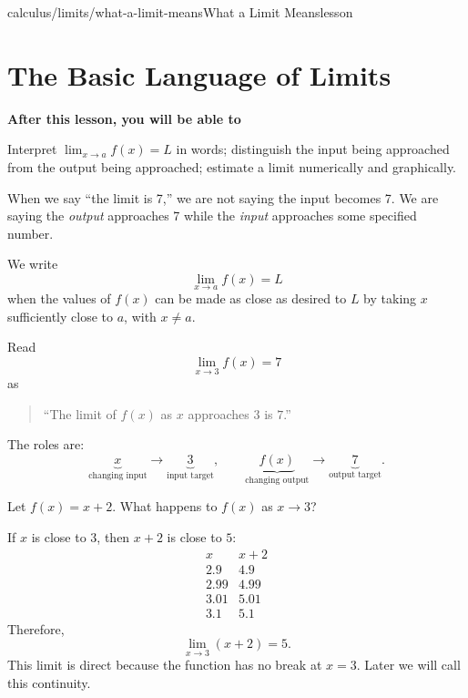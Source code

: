 \documentclass[11pt,openany]{book}
\theoremstyle{bgplain}
\newcommand{\lessonobjective}[1]{%
  \par\Needspace{4\baselineskip}\addvspace{0.6em}%
  {\bfseries\color{BGInk}After this lesson, you will be able to}\par\smallskip
  #1\par\addvspace{0.5em}%
}
\begin{document}
\begin{webpage}{calculus/limits/what-a-limit-means}{What a Limit Means}{lesson}
\section{The Basic Language of Limits}

\lessonobjective{
Interpret \(\lim_{x\to a}f(x)=L\) in words; distinguish the input being approached from the output being approached; estimate a limit numerically and graphically.
}

\begin{bgconcept}
When we say ``the limit is 7,'' we are not saying the input becomes 7. We are saying the \emph{output} approaches 7 while the \emph{input} approaches some specified number.
\end{bgconcept}

\begin{bgdefinition}
We write
\[
  \boxed{\lim_{x\to a}f(x)=L}
\]
when the values of \(f(x)\) can be made as close as desired to \(L\) by taking \(x\) sufficiently close to \(a\), with \(x\ne a\).
\end{bgdefinition}

Read
\[
  \lim_{x\to3}f(x)=7
\]
as

\begin{quote}
``The limit of \(f(x)\) as \(x\) approaches \(3\) is \(7\).''
\end{quote}

The roles are:
\[
\underbrace{x}_{\text{changing input}}
\to
\underbrace{3}_{\text{input target}},
\qquad
\underbrace{f(x)}_{\text{changing output}}
\to
\underbrace{7}_{\text{output target}}.
\]

\begin{bgguided}[title={A limit with no hole}]
Let \(f(x)=x+2\). What happens to \(f(x)\) as \(x\to3\)?

\begin{bgsolution}
If \(x\) is close to \(3\), then \(x+2\) is close to \(5\):
\[
\begin{array}{c|c}
 x & x+2\\
\hline
2.9&4.9\\
2.99&4.99\\
3.01&5.01\\
3.1&5.1
\end{array}
\]
Therefore,
\[
  \boxed{\lim_{x\to3}(x+2)=5}.
\]
This limit is direct because the function has no break at \(x=3\). Later we will call this continuity.
\end{bgsolution}
\end{bgguided}



\end{webpage}
\end{document}
